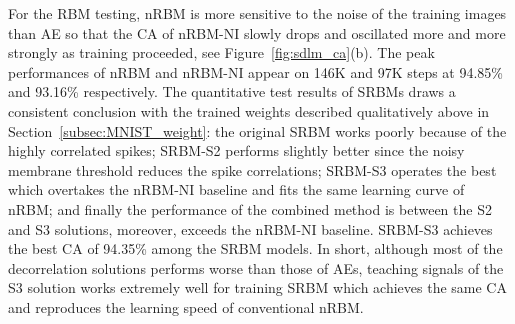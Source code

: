 For the RBM testing, nRBM is more sensitive to the noise of the training images than AE so that the CA of nRBM-NI slowly drops and oscillated more and more strongly as training proceeded, see Figure~\ref{fig:sdlm_ca}(b).
The peak performances of nRBM and nRBM-NI appear on 146K and 97K steps at 94.85\% and 93.16\% respectively. 
The quantitative test results of SRBMs draws a consistent conclusion with the trained weights described qualitatively above in Section~\ref{subsec:MNIST_weight}: the original SRBM works poorly because of the highly correlated spikes; SRBM-S2 performs slightly better since the noisy membrane threshold reduces the spike correlations; SRBM-S3 operates the best which overtakes the nRBM-NI baseline and fits the same learning curve of nRBM; and finally the performance of the combined method is between the S2 and S3 solutions, moreover, exceeds the nRBM-NI baseline.
SRBM-S3 achieves the best CA of 94.35\% among the SRBM models.
In short, although most of the decorrelation solutions performs worse than those of AEs, teaching signals of the S3 solution works extremely well for training SRBM which achieves the same CA and reproduces the learning speed of conventional nRBM.

